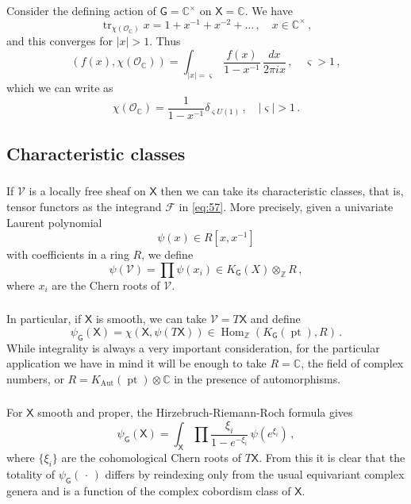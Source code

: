 \documentclass[14pt]{extarticle}
\newcommand{\C}{\mathbb{C}}
\newcommand{\Ct}{\mathbb{C}^\times}
\newcommand{\Z}{\mathbb{Z}}
\newcommand{\bG}{\mathsf{G}}
\newcommand{\bX}{\mathsf{X}}
\newcommand{\cF}{\mathscr{F}}
\newcommand{\cV}{\mathscr{V}}
\newcommand{\cO}{\mathscr{O}}
\DeclareMathOperator{\Hom}{Hom}
\DeclareMathOperator{\Aut}{Aut}
\DeclareMathOperator{\pt}{pt}
\DeclareMathOperator{\tr}{tr}
\theoremstyle{definition}
\begin{document}
Consider the defining action of $\bG=\Ct$ on $\bX=\C$. We have
%
\begin{equation}
\tr_{\chi(\cO_\C)} x  = 1 + x^{-1} + x^{-2} + \dots \,, \quad  x\in
\Ct\,, \label{eq:53}
\end{equation}
%
and this converges for $|x|> 1$. Thus
%
\begin{equation}
  \label{eq:43}
\left(f(x), \chi(\cO_\C)\right) = \int_{|x|=\varsigma }
\frac{f(x)}{1-x^{-1}} \, \frac{dx}{2\pi i x}  \,, \quad \varsigma > 1
\,, 
\end{equation}
%
which we can write as 
%
\begin{equation}
  \label{eq:2}
  \chi(\cO_\C) = \frac{1}{1-x^{-1}}\delta_{\varsigma U(1)} \,, \quad |\varsigma| > 1 \,. 
\end{equation}

\subsection{Characteristic classes}\label{sGdqs}

\subsubsection{}

If $\cV$ is a locally free sheaf on $\bX$ then we can take its 
characteristic classes, that is, tensor functors as the integrand
$\cF$ in \eqref{eq:57}. 
 More precisely, given a univariate Laurent polynomial 
 \[
   \psi(x) \in R[x,x^{-1}] 
\]
with coefficients in a ring $R$, we define
\[
  \psi(\cV) = \prod \psi(x_i) \in K_\bG(X) \otimes_\Z R \,, 
\]
where $x_i$ are the Chern roots of $\cV$.
\subsubsection{}

In particular, if $\bX$ is smooth, we can take $\cV = T\bX$ and define 
\[
  \psi_\bG(\bX) = \chi(\bX, \psi(T\bX)) \in \Hom_\Z(K_\bG(\pt),R) \,. 
\]
While integrality is always a very important consideration, for the
particular application we have in mind it will be enough to take
$R=\C$, the field of complex numbers, or $R= K_{\Aut}(\pt) \otimes \C$
in the presence of automorphisms. 

\subsubsection{}

For $\bX$ smooth and  proper,
the Hirzebruch-Riemann-Roch formula gives 
\[
  \psi_\bG(\bX) = \int_\bX \prod \frac {\xi_i}{1-e^{-\xi_i}} \,
\psi(e^{\xi_i}) \,,
\]
where $\{\xi_i\}$ are the cohomological Chern roots of $T\bX$. 
From this it is clear that the totality of $\psi_\bG(\, \cdot \,)$ differs by
reindexing only from the usual equivariant complex genera and is a
function of the complex cobordism class of $\bX$. 
\end{document}
